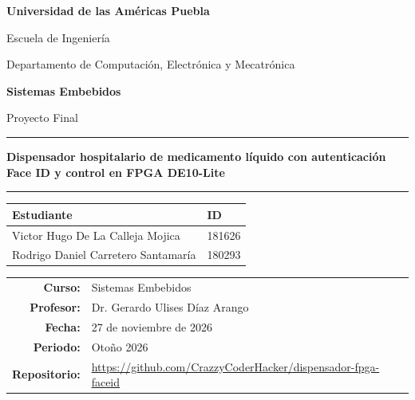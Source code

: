 \documentclass[11pt,letterpaper]{article}
\begin{document}
\begin{titlepage}
\centering
{\large\bfseries Universidad de las Américas Puebla\par}
\vspace{4pt}
Escuela de Ingeniería\par
\vspace{2pt}
Departamento de Computación, Electrónica y Mecatrónica\par
\vspace{2.2cm}
{\bfseries Sistemas Embebidos\par}
\vspace{4pt}
Proyecto Final\par
\vspace{1.4cm}
\rule{\linewidth}{0.6pt}\par
\vspace{10pt}
{\LARGE\bfseries Dispensador hospitalario de medicamento líquido con autenticación Face ID y control en FPGA DE10-Lite\par}
\vspace{10pt}
\rule{\linewidth}{0.6pt}\par
\vspace{1.6cm}
\begin{tabular}{ll}
\textbf{Estudiante} & \textbf{ID} \\
\midrule
Victor Hugo De La Calleja Mojica & 181626 \\
Rodrigo Daniel Carretero Santamaría & 180293 \\
\end{tabular}
\vfill
\begin{tabular}{rl}
\textbf{Curso:} & Sistemas Embebidos \\
\textbf{Profesor:} & Dr. Gerardo Ulises Díaz Arango \\
\textbf{Fecha:} & 27 de noviembre de 2026 \\
\textbf{Periodo:} & Otoño 2026 \\
\textbf{Repositorio:} & \url{https://github.com/CrazzyCoderHacker/dispensador-fpga-faceid} \\
\end{tabular}
\end{titlepage}

\end{document}
